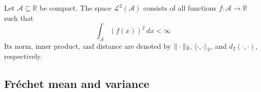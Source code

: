 \begin{definition}
    Let $\mathcal{A} \subseteq \mathbb{R}$ be compact. The space \( \mathcal{L}^2(\mathcal{A}) \)
    consists of all functions \( f: \mathcal{A} \to \mathbb{R} \) such that
    \[
    \int_{\mathcal{A}} (f(x))^2 \, dx < \infty
    \]
    Its norm, inner product, and distance are denoted by $\|\cdot\|_2$,
    $\left \langle \cdot, \cdot \right \rangle_2$, and $d_2(\cdot, \cdot)$, respectively.
\end{definition}

\subsection{Fréchet mean and variance}
\label{sec:f_mean}